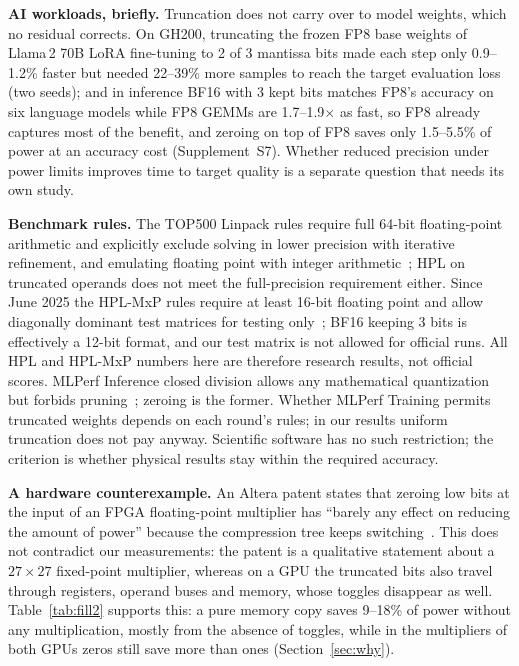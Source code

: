 \documentclass[conference]{IEEEtran}
\newcommand{\pct}{\%}
\begin{document}
\textbf{AI workloads, briefly.} Truncation does not carry over to model weights, which no residual corrects. On
GH200, truncating the frozen FP8 base weights of Llama\,2 70B LoRA fine-tuning to 2 of 3 mantissa bits made each step
only 0.9--1.2\pct{} faster but needed 22--39\pct{} more samples to reach the target evaluation loss (two seeds); and in
inference BF16 with 3 kept bits matches FP8's accuracy on six language models while FP8 GEMMs are 1.7--1.9$\times$ as
fast, so FP8 already captures most of the benefit, and zeroing on top of FP8 saves only 1.5--5.5\pct{} of power at an
accuracy cost (Supplement~S7). Whether reduced precision under power limits improves time to target quality is a
separate question that needs its own study.

\textbf{Benchmark rules.} The TOP500 Linpack rules require full 64-bit floating-point arithmetic and explicitly
exclude solving in lower precision with iterative refinement, and emulating floating point with integer
arithmetic~\cite{TOP500Linpack}; HPL on truncated operands does not meet the full-precision requirement either.
Since June 2025 the HPL-MxP rules require at least 16-bit floating point and allow diagonally dominant
test matrices for testing only~\cite{HPLMxPRules}; BF16 keeping 3 bits is effectively a 12-bit format, and our test matrix
is not allowed for official runs. All HPL and HPL-MxP numbers here are therefore research results, not official
scores. MLPerf Inference closed division allows any mathematical quantization but forbids
pruning~\cite{MLPerfInfRules}; zeroing is the former. Whether MLPerf Training permits truncated weights depends on
each round's rules; in our results uniform truncation does not pay anyway. Scientific software has no such
restriction; the criterion is whether physical results stay within the required accuracy.

\textbf{A hardware counterexample.} An Altera patent states that zeroing low bits at the input of an FPGA
floating-point multiplier has ``barely any effect on reducing the amount of power'' because the compression tree
keeps switching~\cite{Altera2017}. This does not contradict our measurements: the patent is a qualitative statement
about a $27{\times}27$ fixed-point multiplier, whereas on a GPU the truncated bits also travel through registers,
operand buses and memory, whose toggles disappear as well. Table~\ref{tab:fill2} supports this: a pure memory copy
saves 9--18\pct{} of power without any multiplication, mostly from the absence of toggles, while in the multipliers of
both GPUs zeros still save more than ones (Section~\ref{sec:why}).
\end{document}
